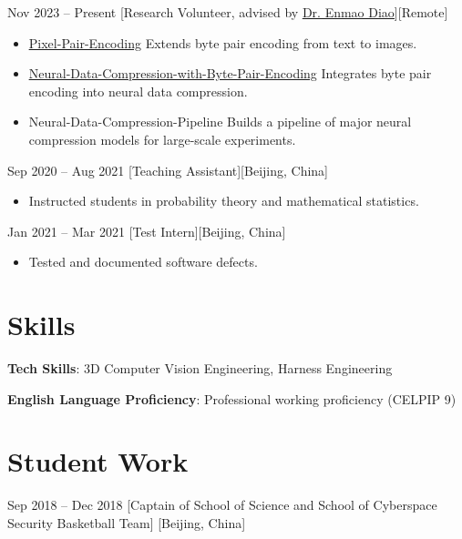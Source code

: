 \documentclass{chicv}
\begin{document}
  {Nov 2023 -- Present}
  [Research Volunteer, advised by \href{https://diaoenmao.com/}{\underline{Dr. Enmao Diao}}][Remote]
  \begin{itemize}
    \item \href{https://gitlab.com/huangyubo/Pixel-Pair-Encoding}{\underline{Pixel-Pair-Encoding}} Extends byte pair encoding from text to images.
    \item \href{https://gitlab.com/huangyubo/Neural-Data-Compression-with-Byte-Pair-Encoding}{\underline{Neural-Data-Compression-with-Byte-Pair-Encoding}} Integrates byte pair encoding into neural data compression.
    \item Neural-Data-Compression-Pipeline Builds a pipeline of major neural compression models for large-scale experiments.
  \end{itemize}

  {Sep 2020 -- Aug 2021}
  [Teaching Assistant][Beijing, China]
  \begin{itemize}
    \item Instructed students in probability theory and mathematical statistics.
  \end{itemize}

  {Jan 2021 -- Mar 2021}
  [Test Intern][Beijing, China]
  \begin{itemize}
    \item Tested and documented software defects.
  \end{itemize}

\section{Skills}
\begin{compactlist}
  \item \textbf{Tech Skills}: 3D Computer Vision Engineering, Harness Engineering
  \item \textbf{English Language Proficiency}: Professional working proficiency (CELPIP 9)
\end{compactlist}

\section{Student Work}
  {Sep 2018 -- Dec 2018}
  [Captain of School of Science and School of Cyberspace Security Basketball Team]
  [Beijing, China]
\end{document}
